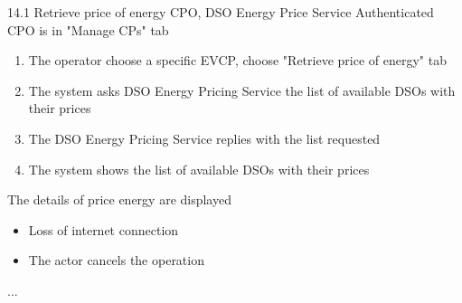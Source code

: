 \usecase
{
}
{14.1}
{Retrieve price of energy} %
{CPO, DSO Energy Price Service} %
{Authenticated CPO is in "Manage CPs" tab} %
{ %
    \begin{enumerate}
        \item The operator choose a specific EVCP, choose "Retrieve price of energy" tab
        \item The system asks DSO Energy Pricing Service the list of available DSOs with their prices
        \item The DSO Energy Pricing Service replies with the list requested
        \item The system shows the list of available DSOs with their prices
    \end{enumerate}
}
{The details of price energy are displayed} %
{ %
    \begin{itemize}
        \item Loss of internet connection
        \item The actor cancels the operation
    \end{itemize}
}
{ %
    ...
}

